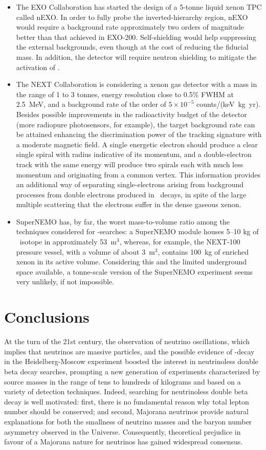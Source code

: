 \documentclass{PoS}
\begin{document}
\begin{itemize}
%
\item The EXO Collaboration has started the design of a 5-tonne liquid xenon TPC called nEXO. In order to fully probe the inverted-hierarchy region, nEXO would require a background rate approximately two orders of magnitude better than that achieved in EXO-200. Self-shielding would help suppressing the external backgrounds, even though at the cost of reducing the fiducial mass. In addition, the detector will require neutron shielding to mitigate the activation of \XE.
%
\item The NEXT Collaboration is considering a xenon gas detector with a mass in the range of 1 to 3 tonnes, energy resolution close to 0.5\% FWHM at 2.5~MeV, and a background rate of the order of $5\times10^{-5}$ counts/(keV~kg~yr). Besides possible improvements in the radioactivity budget of the detector (more radiopure photosensors, for example), the target background rate can be attained enhancing the discrimination power of the tracking signature with a moderate magnetic field. A single energetic electron should produce a clear single spiral with radius indicative of its momentum, and a double-electron track with the same energy will produce two spirals each with much less momentum and originating from a common vertex. This information provides an additional way of separating single-electrons arising from background processes from double electrons produced in \bbonu\ decays, in spite of the large multiple scattering that the electrons suffer in the dense gaseous xenon.
%
\item SuperNEMO has, by far, the worst mass-to-volume ratio among the techniques considered for \bbonu-searches: a SuperNEMO module houses 5--10 kg of \bb\ isotope in approximately 53~m$^{3}$, whereas, for example, the NEXT-100 pressure vessel, with a volume of about 3~m$^{3}$, contains 100~kg of enriched xenon in its active volume. Considering this and the limited underground space available, a tonne-scale version of the SuperNEMO experiment seems very unlikely, if not impossible.
\end{itemize}


\section{Conclusions} \label{Conclusions}
At the turn of the 21st century, the observation of neutrino oscillations, which implies that neutrinos are massive particles, and the possible evidence of \bbonu-decay in the Heidelberg-Moscow experiment \cite{KlapdorKleingrothaus:2001ke} boosted the interest in neutrinoless double beta decay searches, prompting a new generation of experiments characterized by source masses in the range of tens to hundreds of kilograms and based on a variety of detection techniques. Indeed, searching for neutrinoless double beta decay is well motivated: first, there is no fundamental reason why total lepton number should be conserved; and second, Majorana neutrinos provide natural explanations for both the smallness of neutrino masses and the baryon number asymmetry observed in the Universe. Consequently, theoretical prejudice in favour of a Majorana nature for neutrinos has gained widespread consensus.
\end{document}
